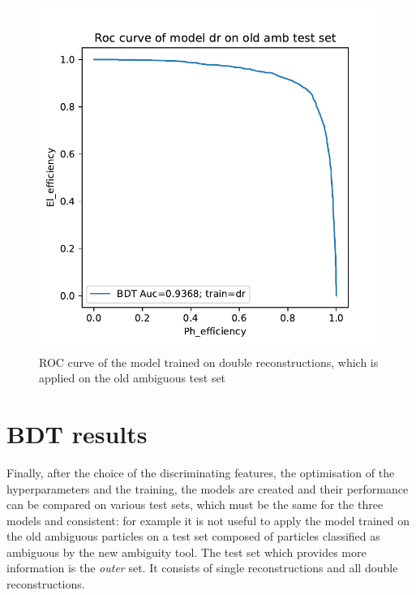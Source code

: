 \documentclass[a4paper, oneside, 11pt, openright]{book}
\begin{document}
			
			
			
			\begin{figure}[H] 
				\centering
				\includegraphics[width=.6\linewidth]{tesi_images/dr_old.pdf} 
				\caption{ROC curve of the model trained on double reconstructions, which is applied on the old ambiguous test set} 
				\label{fig:ex_roc}
			\end{figure}
		\section{BDT results}
			Finally, after the choice of the discriminating features, the optimisation of the hyperparameters and the training, the models are created and their performance can be compared on various test sets, which must be the same for the three models and consistent: for example it is not useful to apply the model trained on the old ambiguous particles on a test set composed of particles classified as ambiguous by the new ambiguity tool. The test set which provides more information is the \textit{outer} set. It consists of single reconstructions and all double reconstructions.
			
\end{document}
